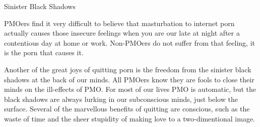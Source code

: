 Sinister Black Shadows

PMOers find it very difficult to believe that masturbation to internet porn actually causes those insecure feelings when you are our late at night after a contentious day at home or work. Non-PMOers do not suffer from that feeling, it is the porn that causes it.

Another of the great joys of quitting porn is the freedom from the sinister black shadows at the back of our minds. All PMOers know they are fools to close their minds on the ill-effects of PMO. For most of our lives PMO is automatic, but the black shadows are always lurking in our subconscious minds, just below the surface. Several of the marvellous benefits of quitting are conscious, such as the waste of time and the sheer stupidity of making love to a two-dimentional image. 
